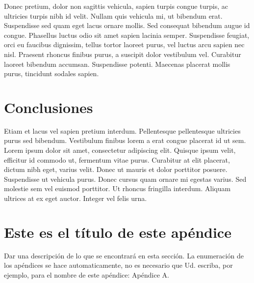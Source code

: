 \documentclass[artMGITG,SIG,accept,moreauthors,font4]{mgitg}
\begin{document}
Donec pretium, dolor non sagittis vehicula, sapien turpis congue turpis, ac ultricies turpis nibh id velit. Nullam quis vehicula mi, ut bibendum erat. Suspendisse sed quam eget lacus ornare mollis. Sed consequat bibendum augue id congue. Phasellus luctus odio sit amet sapien lacinia semper. Suspendisse feugiat, orci eu faucibus dignissim, tellus tortor laoreet purus, vel luctus arcu sapien nec nisl. Praesent rhoncus finibus purus, a suscipit dolor vestibulum vel. Curabitur laoreet bibendum accumsan. Suspendisse potenti. Maecenas placerat mollis purus, tincidunt sodales sapien. 

\section{Conclusiones}
%
\noindent
Etiam et lacus vel sapien pretium interdum. Pellentesque pellentesque ultricies purus sed bibendum. Vestibulum finibus lorem a erat congue placerat id ut sem. Lorem ipsum dolor sit amet, consectetur adipiscing elit. Quisque ipsum velit, efficitur id commodo ut, fermentum vitae purus. Curabitur at elit placerat, dictum nibh eget, varius velit. Donec ut mauris et dolor porttitor posuere. Suspendisse ut vehicula purus. Donec cursus quam ornare mi egestas varius. Sed molestie sem vel euismod porttitor. Ut rhoncus fringilla interdum. Aliquam ultrices at ex eget auctor. Integer vel felis urna. 





\appendix   %
\section{Este es el título de este apéndice}
Dar una descripción de lo que se encontrará en esta sección. La enumeración de los apéndices se hace automaticamente, no es necesario que Ud. escriba, por ejemplo, para el nombre de este apéndice: Apéndice A.
\end{document}
